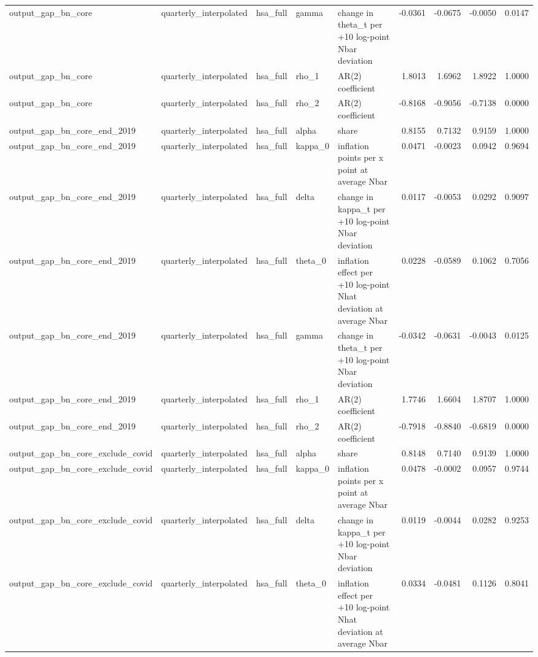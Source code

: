 \begin{tabular}{lllllrrrr}
output\_gap\_bn\_core & quarterly\_interpolated & hsa\_full & gamma & change in theta\_t per +10 log-point Nbar deviation & -0.0361 & -0.0675 & -0.0050 & 0.0147 \\
output\_gap\_bn\_core & quarterly\_interpolated & hsa\_full & rho\_1 & AR(2) coefficient & 1.8013 & 1.6962 & 1.8922 & 1.0000 \\
output\_gap\_bn\_core & quarterly\_interpolated & hsa\_full & rho\_2 & AR(2) coefficient & -0.8168 & -0.9056 & -0.7138 & 0.0000 \\
output\_gap\_bn\_core\_end\_2019 & quarterly\_interpolated & hsa\_full & alpha & share & 0.8155 & 0.7132 & 0.9159 & 1.0000 \\
output\_gap\_bn\_core\_end\_2019 & quarterly\_interpolated & hsa\_full & kappa\_0 & inflation points per x point at average Nbar & 0.0471 & -0.0023 & 0.0942 & 0.9694 \\
output\_gap\_bn\_core\_end\_2019 & quarterly\_interpolated & hsa\_full & delta & change in kappa\_t per +10 log-point Nbar deviation & 0.0117 & -0.0053 & 0.0292 & 0.9097 \\
output\_gap\_bn\_core\_end\_2019 & quarterly\_interpolated & hsa\_full & theta\_0 & inflation effect per +10 log-point Nhat deviation at average Nbar & 0.0228 & -0.0589 & 0.1062 & 0.7056 \\
output\_gap\_bn\_core\_end\_2019 & quarterly\_interpolated & hsa\_full & gamma & change in theta\_t per +10 log-point Nbar deviation & -0.0342 & -0.0631 & -0.0043 & 0.0125 \\
output\_gap\_bn\_core\_end\_2019 & quarterly\_interpolated & hsa\_full & rho\_1 & AR(2) coefficient & 1.7746 & 1.6604 & 1.8707 & 1.0000 \\
output\_gap\_bn\_core\_end\_2019 & quarterly\_interpolated & hsa\_full & rho\_2 & AR(2) coefficient & -0.7918 & -0.8840 & -0.6819 & 0.0000 \\
output\_gap\_bn\_core\_exclude\_covid & quarterly\_interpolated & hsa\_full & alpha & share & 0.8148 & 0.7140 & 0.9139 & 1.0000 \\
output\_gap\_bn\_core\_exclude\_covid & quarterly\_interpolated & hsa\_full & kappa\_0 & inflation points per x point at average Nbar & 0.0478 & -0.0002 & 0.0957 & 0.9744 \\
output\_gap\_bn\_core\_exclude\_covid & quarterly\_interpolated & hsa\_full & delta & change in kappa\_t per +10 log-point Nbar deviation & 0.0119 & -0.0044 & 0.0282 & 0.9253 \\
output\_gap\_bn\_core\_exclude\_covid & quarterly\_interpolated & hsa\_full & theta\_0 & inflation effect per +10 log-point Nhat deviation at average Nbar & 0.0334 & -0.0481 & 0.1126 & 0.8041 \\

\end{tabular}
